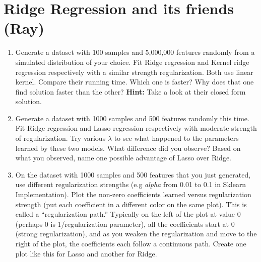 \documentclass{exam}
\begin{document}
\section{Ridge Regression and its friends (Ray)}
\begin{enumerate}
    \item Generate a dataset with 100 samples and 5,000,000 features randomly from a simulated distribution of your choice. Fit Ridge regression and Kernel ridge regression respectively with a similar strength regularization. Both use linear kernel. Compare their running time. Which one is faster? Why does that one find solution faster than the other? \textbf{Hint: } Take a look at their closed form solution. 
    \item Generate a dataset with 1000 samples and 500 features randomly this time. Fit Ridge regression and Lasso regression respectively with moderate strength of regularization. Try various $\lambda$ to see what happened to the parameters learned by these two models. What difference did you observe? Based on what you observed, name one possible advantage of Lasso over Ridge.
    \item On the dataset with 1000 samples and 500 features that you just generated, use different regularization strengths (e.g \textit{alpha} from 0.01 to 0.1 in Sklearn Implementation). Plot the non-zero coefficients learned versus regularization strength (put each coefficient in a different color on the same plot). This is called a ``regularization path.'' Typically on the left of the plot at value 0 (perhaps 0 is 1/regularization parameter), all the coefficients start at 0 (strong regularization), and as you weaken the regularization and move to the right of the plot, the coefficients each follow a continuous path. Create one plot like this for Lasso and another for Ridge.
\end{enumerate}
\end{document}
